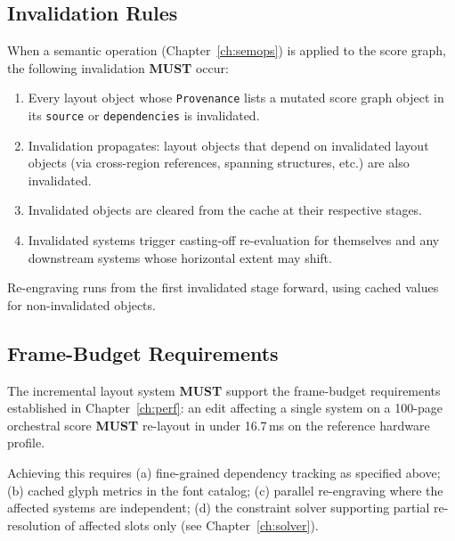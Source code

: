 \documentclass[11pt,letterpaper]{report}
\newcounter{requirement}[chapter]
\newcommand{\MUST}{\textbf{MUST}}
\begin{document}
\subsection{Invalidation Rules}

\begin{requirement}
  \label{req:layoutir:dependency-invalidation}
  When a semantic operation (Chapter~\ref{ch:semops}) is applied to
  the score graph, the following invalidation \MUST{} occur:

  \begin{enumerate}
    \item Every layout object whose \texttt{Provenance} lists a
      mutated score graph object in its \texttt{source} or
      \texttt{dependencies} is invalidated.
    \item Invalidation propagates: layout objects that depend on
      invalidated layout objects (via cross-region references,
      spanning structures, etc.) are also invalidated.
    \item Invalidated objects are cleared from the cache at their
      respective stages.
    \item Invalidated systems trigger casting-off re-evaluation for
      themselves and any downstream systems whose horizontal extent
      may shift.
  \end{enumerate}

  Re-engraving runs from the first invalidated stage forward, using
  cached values for non-invalidated objects.
\end{requirement}

\subsection{Frame-Budget Requirements}

\begin{requirement}
  \label{req:layoutir:incremental-frame-budget}
  The incremental layout system \MUST{} support the frame-budget
  requirements established in Chapter~\ref{ch:perf}: an edit
  affecting a single system on a 100-page orchestral score \MUST{}
  re-layout in under 16.7\,ms on the reference hardware profile.

  Achieving this requires (a) fine-grained dependency tracking as
  specified above; (b) cached glyph metrics in the font catalog;
  (c) parallel re-engraving where the affected systems are
  independent; (d) the constraint solver supporting partial
  re-resolution of affected slots only (see Chapter~\ref{ch:solver}).
\end{requirement}
\end{document}

